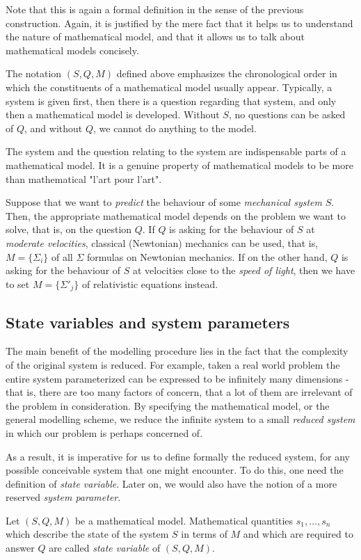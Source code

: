 Note that this is again a formal definition in the sense of the previous construction. Again, it is justified by the mere fact that it helps us to understand the nature of mathematical model, and that it allows us to talk about mathematical models concisely. 

The notation $(S,Q,M)$ defined above emphasizes the chronological order in which the constituents of a mathematical model usually appear. Typically, a system is given first, then there is a question regarding that system, and only then a mathematical model is developed. Without $S$, no questions can be asked of $Q$, and without $Q$, we cannot do anything to the model. 

The system and the question relating to the system are indispensable parts of a mathematical model. It is a genuine property of mathematical models to be more than mathematical "l'art pour l'art". 
\begin{example}
    Suppose that we want to \textit{predict} the behaviour of some \textit{mechanical system} $S$. Then, the appropriate mathematical model depends on the problem we want to solve, that is, on the question $Q$. If $Q$ is asking for the behaviour of $S$ at \textit{moderate velocities}, classical (Newtonian) mechanics can be used, that is, $M=\{ \Sigma_{i} \}$ of all $\Sigma$ formulas on Newtonian mechanics. If on the other hand, $Q$ is asking for the behaviour of $S$ at velocities close to the \textit{speed of light}, then we have to set $M=\{ \Sigma'_{j} \}$ of relativistic equations instead. 
\end{example}
\subsection{State variables and system parameters}
The main benefit of the modelling procedure lies in the fact that the complexity of the original system is reduced. For example, taken a real world problem the entire system parameterized can be expressed to be infinitely many dimensions - that is, there are too many factors of concern, that a lot of them are irrelevant of the problem in consideration. By specifying the mathematical model, or the general modelling scheme, we reduce the infinite system to a small \textit{reduced system} in which our problem is perhaps concerned of. 

As a result, it is imperative for us to define formally the reduced system, for any possible conceivable system that one might encounter. To do this, one need the definition of \textit{state variable}. Later on, we would also have the notion of a more reserved \textit{system parameter}. 
\begin{definition}
    Let $(S,Q,M)$ be a mathematical model. Mathematical quantities $s_1,\dots,s_n$ which describe the state of the system $S$ in terms of $M$ and which are required to answer $Q$ are called \textit{state variable} of $(S,Q,M)$. 
\end{definition}


